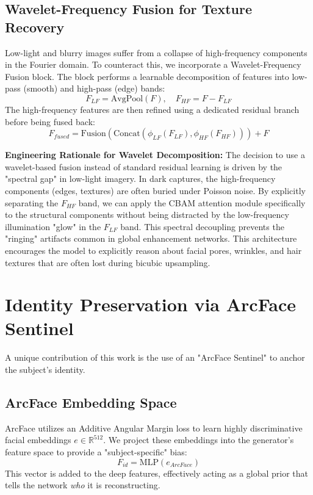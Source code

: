 \subsection{Wavelet-Frequency Fusion for Texture Recovery}
Low-light and blurry images suffer from a collapse of high-frequency components in the Fourier domain. To counteract this, we incorporate a Wavelet-Frequency Fusion block. The block performs a learnable decomposition of features into low-pass (smooth) and high-pass (edge) bands:
\begin{equation}
    F_{LF} = \text{AvgPool}(F), \quad F_{HF} = F - F_{LF}
\end{equation}
The high-frequency features are then refined using a dedicated residual branch before being fused back:
\begin{equation}
    F_{fused} = \text{Fusion}(\text{Concat}(\phi_{LF}(F_{LF}), \phi_{HF}(F_{HF}))) + F
\end{equation}

\textbf{Engineering Rationale for Wavelet Decomposition:} The decision to use a wavelet-based fusion instead of standard residual learning is driven by the "spectral gap" in low-light imagery. In dark captures, the high-frequency components (edges, textures) are often buried under Poisson noise. By explicitly separating the $F_{HF}$ band, we can apply the CBAM attention module specifically to the structural components without being distracted by the low-frequency illumination "glow" in the $F_{LF}$ band. This spectral decoupling prevents the "ringing" artifacts common in global enhancement networks.
    This architecture encourages the model to explicitly reason about facial pores, wrinkles, and hair textures that are often lost during bicubic upsampling.

\section{Identity Preservation via ArcFace Sentinel}
A unique contribution of this work is the use of an "ArcFace Sentinel" to anchor the subject's identity. 

\subsection{ArcFace Embedding Space}
ArcFace utilizes an Additive Angular Margin loss to learn highly discriminative facial embeddings $e \in \mathbb{R}^{512}$. We project these embeddings into the generator's feature space to provide a "subject-specific" bias:
\begin{equation}
    F_{id} = \text{MLP}(e_{ArcFace})
\end{equation}
This vector is added to the deep features, effectively acting as a global prior that tells the network \textit{who} it is reconstructing.

